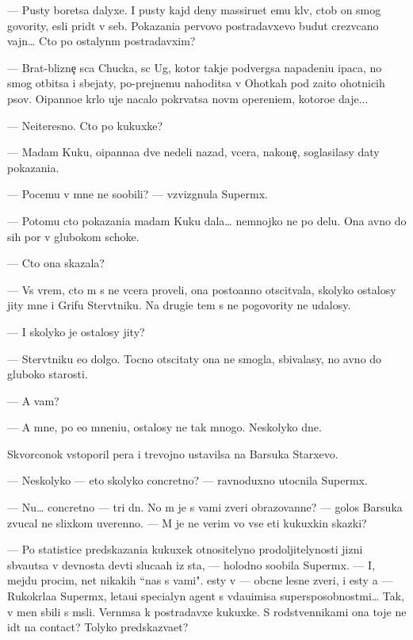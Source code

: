 \documentclass[12pt]{book}
\begin{document}
— Pusty boretsa dalyxe. I pusty kajd{\yi}{\y} deny massiru{\y}et {\y}emu kl{\io}v, ctob{\yi} on smog govority, {\y}esli prid{\e}t v seb{\ia}. Pokazani{\y}a pervovo postradavxevo budut crezv{\yi}ca{\y}no vajn{\yi}… Cto po ostalyn{\yi}m postradavxim?

— Brat-blizne{\c} s{\yi}ca Chucka, s{\yi}c Ug, kotor{\yi}{\y} takje podvergsa napadeni{\y}u {\X}ipaca, no smog otbitsa i sbejaty, po-prejnemu nahoditsa v Ohotkah pod za{\x}ito{\y} ohotnic{\yf}ih psov. O{\x}ipanno{\y}e kr{\yi}lo uje nacalo pokr{\yi}vatsa nov{\yi}m opereni{\y}em, kotoro{\y}e daje...

— Neiteresno. Cto po kukuxke?

— Madam Kuku, o{\x}ipanna{\y}a dve nedeli nazad, vcera, nakone{\c}, soglasilasy daty pokazani{\y}a.

— Pocemu v{\yi} mne ne soob{\x}ili? — vzvizgnula Superm{\yi}x.

— Potomu cto pokazani{\y}a madam Kuku dala… nemnojko ne po delu. Ona {\y}avno do sih por v glubokom schoke.

— Cto ona skazala?

— Vs{\e} vrem{\ia}, cto m{\yi} s ne{\y} vcera proveli, ona posto{\y}anno otscit{\yi}vala, skolyko ostalosy jity mne i Grifu Sterv{\ia}tniku. Na drugi{\y}e tem{\yi} s ne{\y} pogovority ne udalosy.

— I skolyko je ostalosy jity?

— Sterv{\ia}tniku {\y}e{\x}o dolgo. Tocno otscitaty ona ne smogla, sbivalasy, no {\y}avno do gluboko{\y} starosti.

— A vam?

— A mne, po {\y}e{\y}o mneni{\y}u, ostalosy ne tak mnogo. Neskolyko dne{\y}.

Skvorconok vstopor{\x}il per{\y}a i trevojno ustavilsa na Barsuka Starxevo.

— Neskolyko — eto skolyko concretno? — ravnoduxno utocnila Superm{\yi}x.

— Nu… concretno — tri dn{\ia}. No m{\yi} je s vami zveri obrazovann{\yi}{\y}e? — golos Barsuka zvucal ne slixkom uverenno. — M{\yi} je ne verim vo vse eti kukuxkin{\yi} skazki?

— Po statistice predskazani{\y}a kukuxek otnositelyno prodoljitelynosti jizni sb{\yi}va{\y}utsa v dev{\ia}nosta dev{\ia}ti sluca{\y}ah iz sta, — holodno soob{\x}ila Superm{\yi}x. — I, mejdu procim, net nikakih ``nas s vami". {\Y}esty v{\yi} — ob{\yi}cn{\yi}{\y}e lesn{\yi}{\y}e zveri, i {\y}esty {\y}a — Rukokr{\yi}la{\y}a Superm{\yi}x, leta{\y}u{\x}i{\y} specialyn{\yi}{\y} agent s v{\yi}da{\y}u{\x}imisa supersposobnost{\ia}mi… Tak, v{\yi} men{\ia} sbili s m{\yi}sli. Vern{\e}msa k postradavxe{\y} kukuxke. S rodstvennikami ona toje ne id{\e}t na contact? Tolyko predskaz{\yi}va{\y}et?
\end{document}
